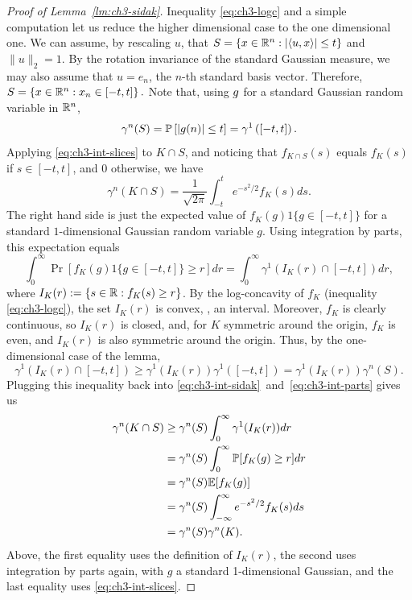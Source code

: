 \begin{proof}[Proof of Lemma~\ref{lm:ch3-sidak}]
  Inequality \eqref{eq:ch3-logc} and a simple computation let us
  reduce the higher dimensional case to the one dimensional one. We can  assume, by rescaling $u$, that $S = \{x \in \mathbb{R}^n: |\langle u,x\rangle| \le t\}$ and $\|u\|_2 = 1$. By
  the rotation invariance of the standard Gaussian measure, we may also
  assume that \(u = e_n\), the $n$-th standard basis vector.  Therefore,
  \(
  S = \left\{x \in \mathbb{R}^n: x_n \in \left[-t,t\right]\right\}.
  \)
  Note that, using \(g\) for a standard Gaussian random variable in \(\mathbb{R}^n\),
  \begin{align*}
    \gamma^n(S) = \mathbb{P}\left[|g(n)| \le t\right]
    = \gamma^1\left(\left[-t,t\right]\right).
  \end{align*}
  Applying \eqref{eq:ch3-int-slices} to $K \cap S$, and noticing that $f_{K \cap S}(s)$ equals $f_K(s)$ if $s \in [-t,t]$, and $0$ otherwise, we have
  \begin{equation}\label{eq:ch3-int-sidak}
      \gamma^n(K \cap S) = \frac{1}{\sqrt{2\pi}} \int_{-t}^{t} e^{-s^2/2} f_K(s)ds.
  \end{equation}
  The right hand side is just the expected value of $f_K(g)1\{g \in [-t,t]\}$ for a standard $1$-dimensional Gaussian random variable $g$. Using integration by parts, this expectation equals
  \begin{equation} \label{eq:ch3-int-parts}
      \int_{0}^\infty \Pr[f_K(g)1\{g \in [-t,t]\} \ge r]dr
      = \int_{0}^\infty \gamma^1\left(I_K(r)\cap\left[-t,t\right]\right)dr,
  \end{equation}
  where \(I_K(r) := \{s\in \mathbb{R}: f_K(s) \ge r\}\). 
  By the log-concavity of \(f_K\) (inequality \eqref{eq:ch3-logc}), the set
  \(I_K(r)\) is convex, \ie, an
  interval. Moreover, \(f_K\) is clearly continuous, so \(I_K(r)\) is
  closed, and, for \(K\) symmetric around the origin, \(f_K\) is even, and \(I_K(r)\) is also
  symmetric around the origin. Thus, by the one-dimensional case of
  the lemma,
  \[
    \gamma^1\left(I_K(r)\cap \left[-t, t\right]\right)
    \ge
    \gamma^1(I_K(r)) \gamma^1\left(\left[-t,t\right]\right)
    = \gamma^1(I_K(r)) \gamma^n(S).
  \]
  Plugging this inequality back into \eqref{eq:ch3-int-sidak}~and~\eqref{eq:ch3-int-parts}%
  gives us
  \begin{align*}
    \gamma^n(K \cap S) %
    &\ge \gamma^n(S) \int_{0}^\infty \gamma^1(I_K(r))dr\\
    &= \gamma^n(S) \int_{0}^\infty \Pr[f_K(g) \ge r]dr\\
    &= \gamma^n(S) \E[f_K(g)]\\
    &= \gamma^n(S)\int_{-\infty}^\infty e^{-s^2/2}f_K(s)ds\\
    &= \gamma^n(S)\gamma^n(K).
  \end{align*}
  Above, the first equality uses the definition of $I_K(r)$, the second uses integration by parts again, with $g$ a standard 1-dimensional Gaussian, and the last equality uses \eqref{eq:ch3-int-slices}.
\end{proof}

